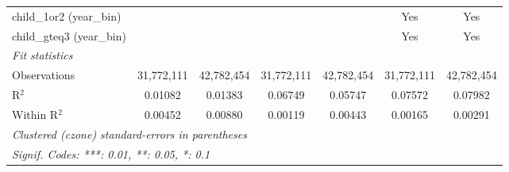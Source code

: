 \begin{tabular}{lcccccc}
child\_1or2 (year\_bin) &  &  &  &  & Yes & Yes\\
child\_gteq3 (year\_bin) &  &  &  &  & Yes & Yes\\
\midrule \emph{Fit statistics}&  & & & & & \\
Observations & 31,772,111&42,782,454&31,772,111&42,782,454&31,772,111&42,782,454\\
R$^2$ & 0.01082&0.01383&0.06749&0.05747&0.07572&0.07982\\
Within R$^2$ & 0.00452&0.00880&0.00119&0.00443&0.00165&0.00291\\
\midrule\midrule\multicolumn{7}{l}{\emph{Clustered (czone) standard-errors in parentheses}}\\
\multicolumn{7}{l}{\emph{Signif. Codes: ***: 0.01, **: 0.05, *: 0.1}}\\
\end{tabular}


